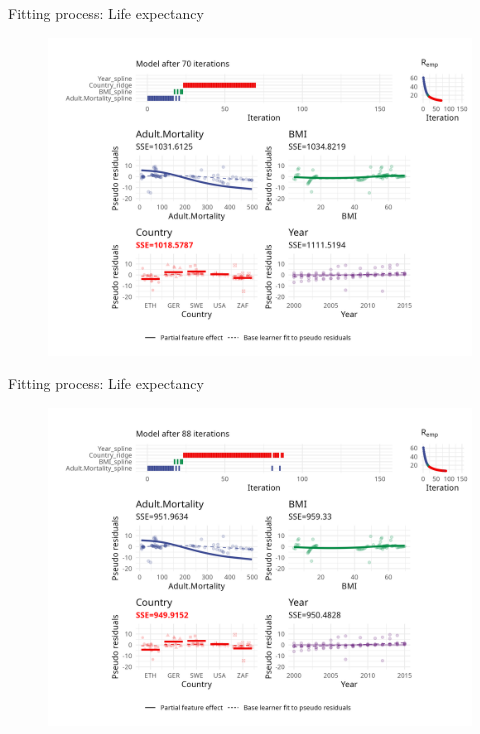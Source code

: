 \begin{frame}{Fitting process: Life expectancy}
	\begin{figure}
		\centering
		\includegraphics[width=\textwidth]{figures/cwb-anim/fig-iter-0070.png}
	\end{figure}
	\addtocounter{framenumber}{-1}
\end{frame}


\begin{frame}{Fitting process: Life expectancy}
	\begin{figure}
		\centering
		\includegraphics[width=\textwidth]{figures/cwb-anim/fig-iter-0088.png}
	\end{figure}
	\addtocounter{framenumber}{-1}
\end{frame}


